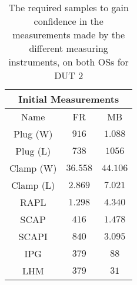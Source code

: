 \begin{table}[H]
    \centering
    \begin{tabular}{|| c | c | c ||}
    \hline
    \multicolumn{3}{||c||}{Initial Measurements} \\ [0.5ex] \hline\hline
    Name & FR & MB \\\hline
    Plug (W) & $916$ & $1.088$ \\
    Plug (L) & $738$ & $1056$ \\
    Clamp (W) & $36.558$ & $44.106$ \\
    Clamp (L) & $2.869$ & $7.021$ \\
    RAPL & $1.298$ & $4.340$ \\
    SCAP & $416$ & $1.478$ \\
    SCAPI & $840$ & $3.095$ \\
    IPG & $379$ & $88$ \\
    LHM & $379$ & $31$ \\\hline
    \end{tabular}
    \caption{The required samples to gain confidence in the measurements made by the different measuring instruments, on both OSs for DUT 2}
    \label{tab:initial-measurements-exp-2-dut-2}
\end{table}
